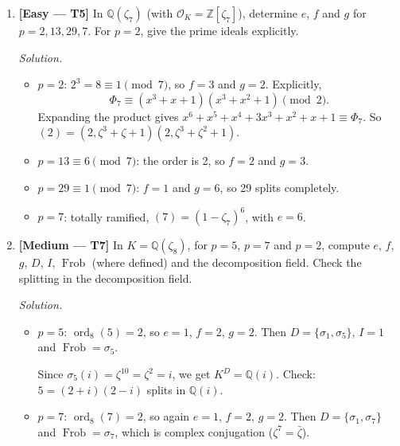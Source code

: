 \documentclass[11pt]{article}
\newcommand{\Z}{\mathbb{Z}}
\newcommand{\Q}{\mathbb{Q}}
\newcommand{\OK}{\mathcal{O}_K}
\DeclareMathOperator{\Frob}{Frob}
\DeclareMathOperator{\ord}{ord}
\begin{document}
\begin{enumerate}[label=\textbf{B\arabic*.}]
\begin{enumerate}[label=(\alph*)]
    By contrast, $x^2-17\equiv(x+1)^2\pmod 2$ would suggest ramification. But $[\OK:\Z[\sqrt{17}]]=2$, so Dedekind--Kummer does not apply to $\sqrt{17}$ at $p=2$.
    \item \begin{itemize}
      \item $p=3$: $17\equiv2\pmod3$ is not a square, so 3 is inert. Directly: $x^2-x-4\equiv x^2+2x+2\pmod 3$ takes the values $2,2,1$ at $0,1,2$, so it has no roots.
      \item $p=13$: $17\equiv4=2^2\pmod{13}$, so 13 splits.
    \end{itemize}
  \end{enumerate}

  \item \textbf{[Easy --- T5]} In $\Q(\zeta_7)$ (with $\OK=\Z[\zeta_7]$), determine $e$, $f$ and $g$ for $p=2,13,29,7$. For $p=2$, give the prime ideals explicitly.

  \textit{Solution.}
  \begin{itemize}
    \item $p=2$: $2^3=8\equiv1\pmod7$, so $f=3$ and $g=2$. Explicitly,
    \[
    \Phi_7\equiv(x^3+x+1)(x^3+x^2+1)\pmod 2.
    \]
    Expanding the product gives $x^6+x^5+x^4+3x^3+x^2+x+1\equiv\Phi_7$. So $(2)=(2,\zeta^3+\zeta+1)(2,\zeta^3+\zeta^2+1)$.
    \item $p=13\equiv6\pmod7$: the order is 2, so $f=2$ and $g=3$.
    \item $p=29\equiv1\pmod7$: $f=1$ and $g=6$, so 29 splits completely.
    \item $p=7$: totally ramified, $(7)=(1-\zeta_7)^6$, with $e=6$.
  \end{itemize}

  \item \textbf{[Medium --- T7]} In $K=\Q(\zeta_8)$, for $p=5$, $p=7$ and $p=2$, compute $e$, $f$, $g$, $D$, $I$, $\Frob$ (where defined) and the decomposition field. Check the splitting in the decomposition field.

  \textit{Solution.}
  \begin{itemize}
    \item $p=5$: $\ord_8(5)=2$, so $e=1$, $f=2$, $g=2$. Then $D=\{\sigma_1,\sigma_5\}$, $I=1$ and $\Frob=\sigma_5$.

    Since $\sigma_5(i)=\zeta^{10}=\zeta^2=i$, we get $K^D=\Q(i)$. Check: $5=(2+i)(2-i)$ splits in $\Q(i)$.
    \item $p=7$: $\ord_8(7)=2$, so again $e=1$, $f=2$, $g=2$. Then $D=\{\sigma_1,\sigma_7\}$ and $\Frob=\sigma_7$, which is complex conjugation ($\zeta^7=\bar\zeta$).


\end{itemize}
\end{enumerate}
\end{document}
